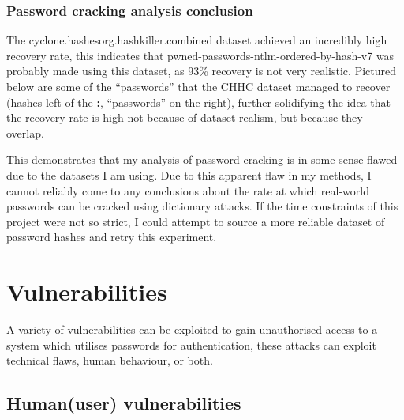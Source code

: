 \documentclass[11pt]{article}
\begin{document}
\subsubsection{Password cracking analysis conclusion}
The cyclone.hashesorg.hashkiller.combined dataset achieved an incredibly high recovery rate, this indicates that pwned-passwords-ntlm-ordered-by-hash-v7 was probably made using this dataset, as 93\% recovery is not very realistic.
Pictured below are some of the ``passwords'' that the CHHC dataset managed to recover (hashes left of the \textbf{:}, ``passwords'' on the right), further solidifying the idea that the recovery rate is high not because of dataset realism, but because they overlap.
\begin{center}
\end{center}
This demonstrates that my analysis of password cracking is in some sense flawed due to the datasets I am using.
Due to this apparent flaw in my methods, I cannot reliably come to any conclusions about the rate at which real-world passwords can be cracked using dictionary attacks.
If the time constraints of this project were not so strict, I could attempt to source a more reliable dataset of password hashes and retry this experiment.


\section{Vulnerabilities} \label{VULN}
A variety of vulnerabilities can be exploited to gain unauthorised access to a system which utilises passwords for authentication, these attacks can exploit technical flaws, human behaviour, or both.
\subsection{Human(user) vulnerabilities}
\end{document}
